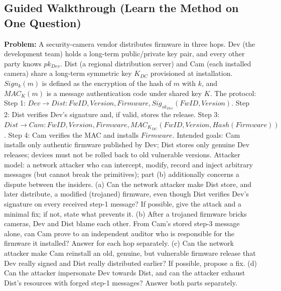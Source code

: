 \documentclass[12pt, a4paper]{article}
\begin{document}
\subsection*{Guided Walkthrough (Learn the Method on One Question)}
\textbf{Problem:} A security-camera vendor distributes firmware in three hops. Dev (the development team) holds a long-term public/private key pair, and every other party knows $pk_{Dev}$. Dist (a regional distribution server) and Cam (each installed camera) share a long-term symmetric key $K_{DC}$ provisioned at installation. $Sign_k(m)$ is defined as the encryption of the hash of $m$ with $k$, and $MAC_K(m)$ is a message authentication code under shared key $K$. The protocol: Step 1: $Dev \to Dist : FwID, Version, Firmware, Sig_{sk_{Dev}}(FwID, Version)$. Step 2: Dist verifies Dev's signature and, if valid, stores the release. Step 3: $Dist \to Cam : FwID, Version, Firmware, MAC_{K_{DC}}(FwID, Version, Hash(Firmware))$. Step 4: Cam verifies the MAC and installs $Firmware$. Intended goals: Cam installs only authentic firmware published by Dev; Dist stores only genuine Dev releases; devices must not be rolled back to old vulnerable versions. Attacker model: a network attacker who can intercept, modify, record and inject arbitrary messages (but cannot break the primitives); part (b) additionally concerns a dispute between the insiders. (a) Can the network attacker make Dist store, and later distribute, a modified (trojaned) firmware, even though Dist verifies Dev's signature on every received step-1 message? If possible, give the attack and a minimal fix; if not, state what prevents it. (b) After a trojaned firmware bricks cameras, Dev and Dist blame each other. From Cam's stored step-3 message alone, can Cam prove to an independent auditor who is responsible for the firmware it installed? Answer for each hop separately. (c) Can the network attacker make Cam reinstall an old, genuine, but vulnerable firmware release that Dev really signed and Dist really distributed earlier? If possible, propose a fix. (d) Can the attacker impersonate Dev towards Dist, and can the attacker exhaust Dist's resources with forged step-1 messages? Answer both parts separately.
\end{document}
